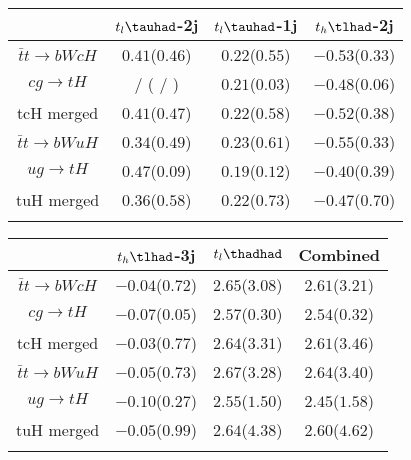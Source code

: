 \centering
\begin{tabular}{cccc} \toprule\toprule
 & $t_l\tauhad$-2j & $t_l\tauhad$-1j & $t_h\tlhad$-2j\\\midrule
$\bar{t}t\to bWcH$ & $0.41$($0.46$) & $0.22$($0.55$) & $-0.53$($0.33$) \\
$cg\to tH$         &  /    ( /    ) & $0.21$($0.03$) & $-0.48$($0.06$) \\
tcH merged         & $0.41$($0.47$) & $0.22$($0.58$) & $-0.52$($0.38$) \\
$\bar{t}t\to bWuH$ & $0.34$($0.49$) & $0.23$($0.61$) & $-0.55$($0.33$) \\
$ug\to tH$         & $0.47$($0.09$) & $0.19$($0.12$) & $-0.40$($0.39$) \\
tuH merged         & $0.36$($0.58$) & $0.22$($0.73$) & $-0.47$($0.70$) \\
\bottomrule\bottomrule\\
\end{tabular}
\begin{tabular}{cccc} \toprule\toprule
 & $t_h\tlhad$-3j & $t_l\thadhad$ & Combined\\\midrule
$\bar{t}t\to bWcH$  & $-0.04$($0.72$) &  $2.65$($3.08$) & $2.61$($3.21$)  \\
$cg\to tH$          & $-0.07$($0.05$) &  $2.57$($0.30$) & $2.54$($0.32$)  \\
tcH merged          & $-0.03$($0.77$) &  $2.64$($3.31$) & $2.61$($3.46$)  \\
$\bar{t}t\to bWuH$  & $-0.05$($0.73$) &  $2.67$($3.28$) & $2.64$($3.40$)  \\
$ug\to tH$          & $-0.10$($0.27$) &  $2.55$($1.50$) & $2.45$($1.58$)  \\
tuH merged          & $-0.05$($0.99$) &  $2.64$($4.38$) & $2.60$($4.62$)  \\
\bottomrule\bottomrule\\
\end{tabular}

